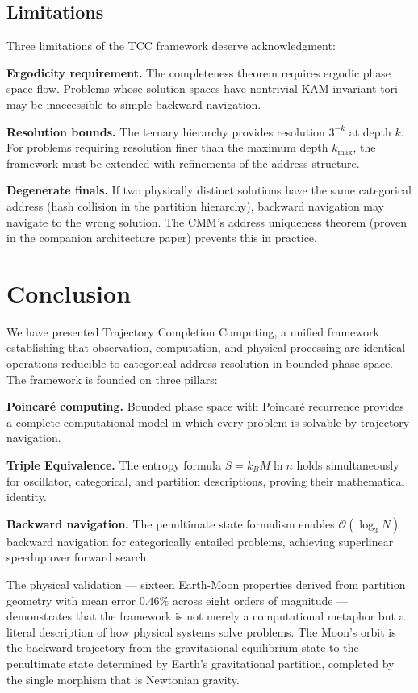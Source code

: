 \documentclass[12pt,twocolumn]{article}
\begin{document}
\subsection{Limitations}

Three limitations of the TCC framework deserve acknowledgment:

\textbf{Ergodicity requirement.} The completeness theorem requires ergodic phase space flow. Problems whose solution spaces have nontrivial KAM invariant tori may be inaccessible to simple backward navigation.

\textbf{Resolution bounds.} The ternary hierarchy provides resolution $3^{-k}$ at depth $k$. For problems requiring resolution finer than the maximum depth $k_{\max}$, the framework must be extended with refinements of the address structure.

\textbf{Degenerate finals.} If two physically distinct solutions have the same categorical address (hash collision in the partition hierarchy), backward navigation may navigate to the wrong solution. The CMM's address uniqueness theorem (proven in the companion architecture paper) prevents this in practice.

\section{Conclusion}
\label{sec:conclusion}

We have presented Trajectory Completion Computing, a unified framework establishing that observation, computation, and physical processing are identical operations reducible to categorical address resolution in bounded phase space. The framework is founded on three pillars:

\textbf{Poincaré computing.} Bounded phase space with Poincaré recurrence provides a complete computational model in which every problem is solvable by trajectory navigation.

\textbf{Triple Equivalence.} The entropy formula $S = k_B M \ln n$ holds simultaneously for oscillator, categorical, and partition descriptions, proving their mathematical identity.

\textbf{Backward navigation.} The penultimate state formalism enables $\mathcal{O}(\log_3 N)$ backward navigation for categorically entailed problems, achieving superlinear speedup over forward search.

The physical validation --- sixteen Earth-Moon properties derived from partition geometry with mean error $0.46\%$ across eight orders of magnitude --- demonstrates that the framework is not merely a computational metaphor but a literal description of how physical systems solve problems. The Moon's orbit is the backward trajectory from the gravitational equilibrium state to the penultimate state determined by Earth's gravitational partition, completed by the single morphism that is Newtonian gravity.
\end{document}
